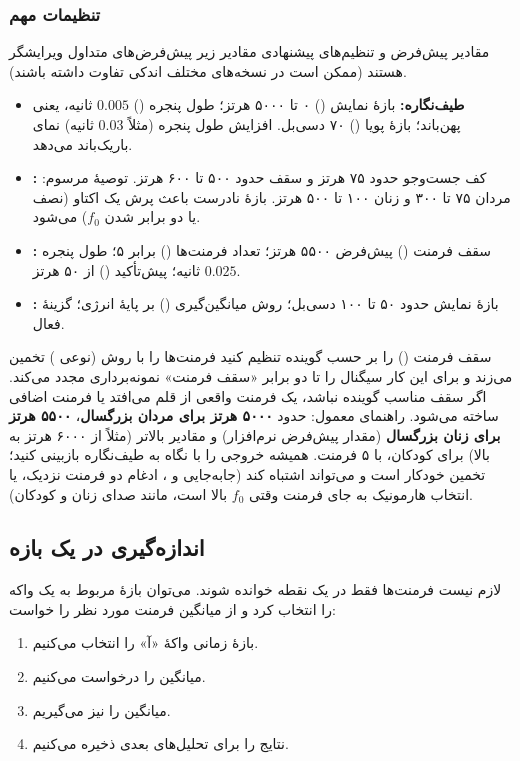 \subsubsection{تنظیمات مهم}
\begin{addedbox}{مقادیر پیش‌فرض و تنظیم‌های پیشنهادی }
مقادیر زیر پیش‌فرض‌های متداول ویرایشگر  هستند (ممکن است در نسخه‌های مختلف اندکی تفاوت داشته باشند).
\begin{itemize}
  \item \textbf{طیف‌نگاره:} بازهٔ نمایش () ۰ تا ۵۰۰۰ هرتز؛ طول پنجره () $0.005$ ثانیه، یعنی پهن‌باند؛ بازهٔ پویا () ۷۰ دسی‌بل. افزایش طول پنجره (مثلاً $0.03$ ثانیه) نمای باریک‌باند می‌دهد.
  \item \textbf{:} کف جست‌وجو حدود ۷۵ هرتز و سقف حدود ۵۰۰ تا ۶۰۰ هرتز. توصیهٔ مرسوم: مردان ۷۵ تا ۳۰۰ و زنان ۱۰۰ تا ۵۰۰ هرتز. بازهٔ نادرست باعث پرش یک اکتاو (نصف یا دو برابر شدن $f_0$) می‌شود.
  \item \textbf{:} سقف فرمنت () پیش‌فرض ۵۵۰۰ هرتز؛ تعداد فرمنت‌ها () برابر ۵؛ طول پنجره $0.025$ ثانیه؛ پیش‌تأکید () از ۵۰ هرتز.
  \item \textbf{:} بازهٔ نمایش حدود ۵۰ تا ۱۰۰ دسی‌بل؛ روش میانگین‌گیری () بر پایهٔ انرژی؛ گزینهٔ  فعال.
\end{itemize}
\end{addedbox}

\begin{correctionbox}{سقف فرمنت () را بر حسب گوینده تنظیم کنید}
 فرمنت‌ها را با روش  (نوعی ) تخمین می‌زند و برای این کار سیگنال را تا دو برابر «سقف فرمنت» نمونه‌برداری مجدد می‌کند. اگر سقف مناسب گوینده نباشد، یک فرمنت واقعی از قلم می‌افتد یا فرمنت اضافی ساخته می‌شود. راهنمای معمول: حدود \textbf{۵۰۰۰ هرتز برای مردان بزرگسال}، \textbf{۵۵۰۰ هرتز برای زنان بزرگسال} (مقدار پیش‌فرض نرم‌افزار) و مقادیر بالاتر (مثلاً از ۶۰۰۰ هرتز به بالا) برای کودکان، با ۵ فرمنت. همیشه خروجی را با نگاه به طیف‌نگاره بازبینی کنید؛ تخمین  خودکار است و می‌تواند اشتباه کند (جابه‌جایی  و ، ادغام دو فرمنت نزدیک، یا انتخاب هارمونیک به جای فرمنت وقتی $f_0$ بالا است، مانند صدای زنان و کودکان).
\end{correctionbox}

\subsection{اندازه‌گیری در یک بازه}
لازم نیست فرمنت‌ها فقط در یک نقطه خوانده شوند. می‌توان بازهٔ مربوط به یک واکه را انتخاب کرد و از  میانگین فرمنت مورد نظر را خواست:
\begin{enumerate}
  \item بازهٔ زمانی واکهٔ «آ» را انتخاب می‌کنیم.
  \item میانگین  را درخواست می‌کنیم.
  \item میانگین  را نیز می‌گیریم.
  \item نتایج را برای تحلیل‌های بعدی ذخیره می‌کنیم.
\end{enumerate}


